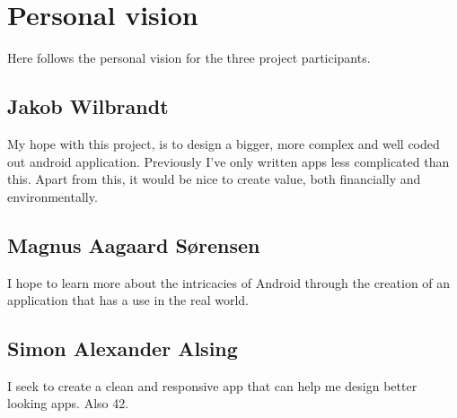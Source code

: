 
\chapter{Personal vision}
Here follows the personal vision for the three project participants.

\section{Jakob Wilbrandt}

My hope with this project, is to design a bigger, more complex and well coded out android application. Previously I've only written apps less complicated than this. Apart from this, it would be nice to create value, both financially and environmentally.


\section{Magnus Aagaard Sørensen}
I hope to learn more about the intricacies of Android through the creation of an application that has a use in the real world.


\section{Simon Alexander Alsing}

I seek to create a clean and responsive app that can help me design better looking apps. Also 42.
